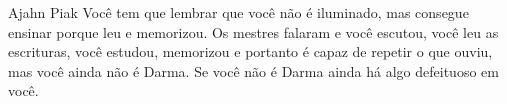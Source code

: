 
\begin{quotepage}{0.55\linewidth}{Ajahn Piak}
Você tem que lembrar que você não é iluminado, mas consegue ensinar porque leu
e memorizou. Os mestres falaram e você escutou, você leu as escrituras, você
estudou, memorizou e portanto é capaz de repetir o que ouviu, mas você ainda
não é Darma. Se você não é Darma ainda há algo defeituoso em você.
\end{quotepage}

